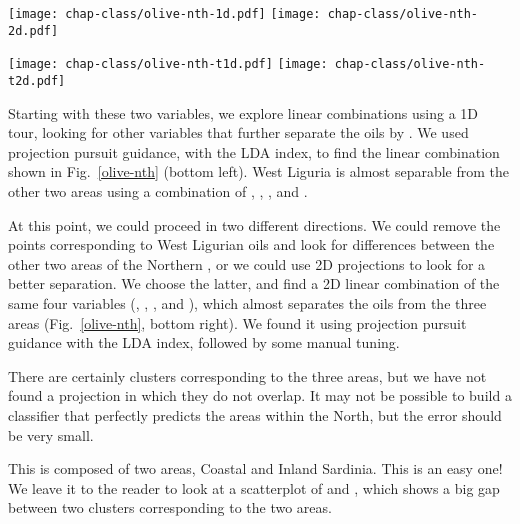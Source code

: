 \begin{figure*}[htb]
\centerline{
  {\texttt{[image: chap-class/olive-nth-1d.pdf]}}
  {\texttt{[image: chap-class/olive-nth-2d.pdf]}}
}
\smallskip
\centerline{
  {\texttt{[image: chap-class/olive-nth-t1d.pdf]}}
  {\texttt{[image: chap-class/olive-nth-t2d.pdf]}}
}
\caption[Separating the oils of the Northern  by
]{Separating the oils of the Northern  by
.  The 1D ASH {\bf (top left)} shows that oils from West
Liguria (the blue cluster at the right of the plot) have a higher
percentage of .  Looking for other variables, we see in
the bivariate scatterplot {\bf (top right)} that  and
 almost separate the three areas.  The 1D and 2D tour
plots {\bf bottom row} show that linear combinations of
, , , and 
are useful for classification.  }
\label{olive-nth}
\end{figure*}

Starting with these two variables, we explore linear combinations
using a 1D tour, looking for other variables that further separate the
oils by .  We used projection pursuit guidance, with the LDA
index, to find the linear combination shown in Fig.~\ref{olive-nth}
(bottom left). West Liguria is almost separable from the other two
areas using a combination of , ,
, and .

At this point, we could proceed in two different directions.  We could
remove the points corresponding to West Ligurian oils and look for
differences between the other two areas of the Northern ,
or we could use 2D projections to look for a better separation.  We
choose the latter, and find a 2D linear combination of the same four
variables (, , , and
), which almost separates the oils from the three areas
(Fig.~\ref{olive-nth}, bottom right). We found it using projection
pursuit guidance with the LDA index, followed by some manual tuning.

There are certainly clusters corresponding to the three areas, but we
have not found a projection in which they do not overlap. It may not be
possible to build a classifier that perfectly predicts the areas
within the  North, but the error should be very small.

\bigskip
{} This  is composed of two areas,
Coastal and Inland Sardinia.  This is an easy one!  We leave it to the
reader to look at a scatterplot of  and , which
shows a big gap between two clusters corresponding to the two areas.

